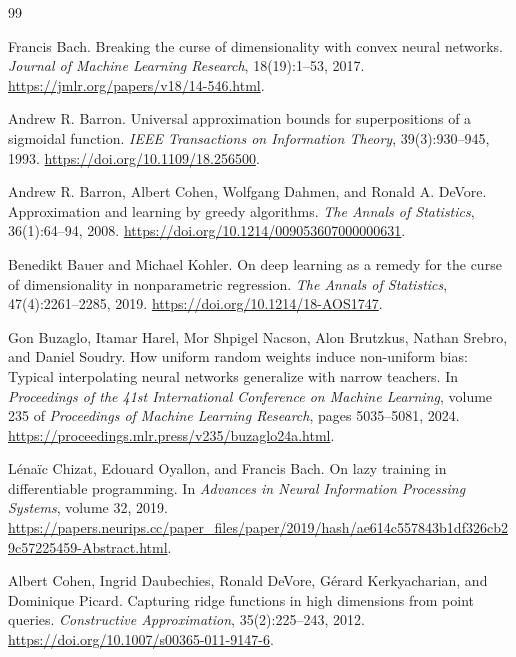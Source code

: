 \documentclass[11pt,twoside]{article}
\theoremstyle{definition}
\theoremstyle{remark}
\begin{document}
\begin{thebibliography}{99}
\raggedright
\small

Francis Bach.
\newblock Breaking the curse of dimensionality with convex neural networks.
\newblock \emph{Journal of Machine Learning Research}, 18(19):1--53, 2017.
\newblock \url{https://jmlr.org/papers/v18/14-546.html}.

Andrew R. Barron.
\newblock Universal approximation bounds for superpositions of a sigmoidal
function.
\newblock \emph{IEEE Transactions on Information Theory}, 39(3):930--945,
1993.
\newblock \url{https://doi.org/10.1109/18.256500}.

Andrew R. Barron, Albert Cohen, Wolfgang Dahmen, and Ronald A. DeVore.
\newblock Approximation and learning by greedy algorithms.
\newblock \emph{The Annals of Statistics}, 36(1):64--94, 2008.
\newblock \url{https://doi.org/10.1214/009053607000000631}.

Benedikt Bauer and Michael Kohler.
\newblock On deep learning as a remedy for the curse of dimensionality in
nonparametric regression.
\newblock \emph{The Annals of Statistics}, 47(4):2261--2285, 2019.
\newblock \url{https://doi.org/10.1214/18-AOS1747}.

Gon Buzaglo, Itamar Harel, Mor Shpigel Nacson, Alon Brutzkus, Nathan Srebro,
and Daniel Soudry.
\newblock How uniform random weights induce non-uniform bias: Typical
interpolating neural networks generalize with narrow teachers.
\newblock In \emph{Proceedings of the 41st International Conference on
Machine Learning}, volume 235 of \emph{Proceedings of Machine Learning
Research}, pages 5035--5081, 2024.
\newblock \url{https://proceedings.mlr.press/v235/buzaglo24a.html}.

L\'ena\"ic Chizat, Edouard Oyallon, and Francis Bach.
\newblock On lazy training in differentiable programming.
\newblock In \emph{Advances in Neural Information Processing Systems},
volume 32, 2019.
\newblock
\url{https://papers.neurips.cc/paper_files/paper/2019/hash/ae614c557843b1df326cb29c57225459-Abstract.html}.

Albert Cohen, Ingrid Daubechies, Ronald DeVore, G\'erard Kerkyacharian, and
Dominique Picard.
\newblock Capturing ridge functions in high dimensions from point queries.
\newblock \emph{Constructive Approximation}, 35(2):225--243, 2012.
\newblock \url{https://doi.org/10.1007/s00365-011-9147-6}.


\end{thebibliography}
\end{document}
